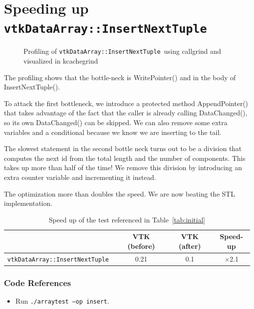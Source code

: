 \documentclass{article}
\def \insertt {{\tt vtkDataArray::InsertNextTuple~}}
\begin{document}
\section{Speeding up \insertt}

\begin{figure}[H]
\caption{Profiling of \insertt using callgrind and visualized in kcachegrind}
\label{fig:insert}
\end{figure}

The profiling shows that the bottle-neck is WritePointer() and
in the body of InsertNextTuple().

To attack the first bottleneck, we introduce a protected method
AppendPointer() that takes advantage of the fact that the caller is
already calling DataChanged(), so its own DataChanged() can be
skipped.  We can also remove some extra variables and a conditional
because we know we are inserting to the tail.

The slowest statement in the second bottle neck turns out to be a
division that computes the next id from the total length and the
number of components. This takes up more than half of the time! We
remove this division by introducing an extra counter variable and
incrementing it instead.

The optimization more than doubles the speed. We are now beating the
STL implementation.
\begin{table}[h]
\centering
\begin{tabular}{r|c|c|c}
         &  VTK (before) & VTK (after) & Speed-up
\\
\hline
\insertt & 0.21          & 0.1         & $\times$2.1
\\
\end{tabular}
\caption{Speed up of the test referenced in Table~\ref{tab:initial}}
\end{table}


\subsubsection*{Code References}
\begin{itemize}
\item Run {\tt ./arraytest --op insert}.
\end{itemize}
\end{document}
